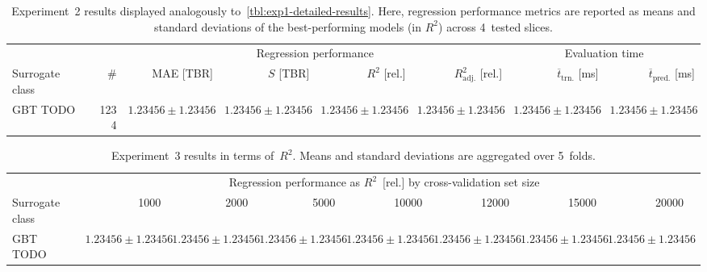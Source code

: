 \begin{table}[h]
	\centering
	{\footnotesize
		\begin{tabular}{lrrrrrrr}
		\toprule
		{} & {} & \multicolumn{4}{c}{Regression performance} &
		\multicolumn{2}{c}{Evaluation time}\\
		\cmidrule(lr){3-6}
		\cmidrule(lr){7-8}
		Surrogate class & \# & MAE [TBR] & $S$ [TBR] & $R^2$ [rel.] & $R^2_{\text{adj.}}$ [rel.]
						& $\overline{t}_{\text{trn.}}$ [ms] &
						$\overline{t}_{\text{pred.}}$ [ms]\\
		\midrule
		GBT TODO
						& \num{1234}
						& $\num{1.23456} \pm \num{1.23456}$
						& $\num{1.23456} \pm \num{1.23456}$
						& $\num{1.23456} \pm \num{1.23456}$
						& $\num{1.23456} \pm \num{1.23456}$
						& $\num{1.23456} \pm \num{1.23456}$
						& $\num{1.23456} \pm \num{1.23456}$
		\\
		\bottomrule
		\end{tabular}
	}
	\caption{Experiment~2 results displayed analogously
		to~\cref{tbl:exp1-detailed-results}. Here, regression performance
		metrics are reported as means and standard deviations of the best-performing
		models (in $R^2$) across 4~tested slices.}
	\label{tbl:exp2-detailed-results}
\end{table}

\begin{table}[h]
	\centering
	{\footnotesize
		\begin{tabular}{lrrrrrrrr}
		\toprule
		{} & \multicolumn{7}{c}{Regression performance as $R^2$~[rel.] by cross-validation set size}\\
		\cmidrule(lr){2-8}
		Surrogate class
						& \num{1000}
						& \num{2000}
						& \num{5000}
						& \num{10000}
						& \num{12000}
						& \num{15000}
						& \num{20000}\\
		\midrule
		GBT TODO
						& $\num{1.23456} \pm \num{1.23456}$
						& $\num{1.23456} \pm \num{1.23456}$
						& $\num{1.23456} \pm \num{1.23456}$
						& $\num{1.23456} \pm \num{1.23456}$
						& $\num{1.23456} \pm \num{1.23456}$
						& $\num{1.23456} \pm \num{1.23456}$
						& $\num{1.23456} \pm \num{1.23456}$
		\\
		\bottomrule
		\end{tabular}
	}
	\caption{Experiment~3 results in terms of~$R^2$. Means and standard
	deviations are aggregated over 5~folds.}
	\label{tbl:exp3-detailed-results-r2}
\end{table}

